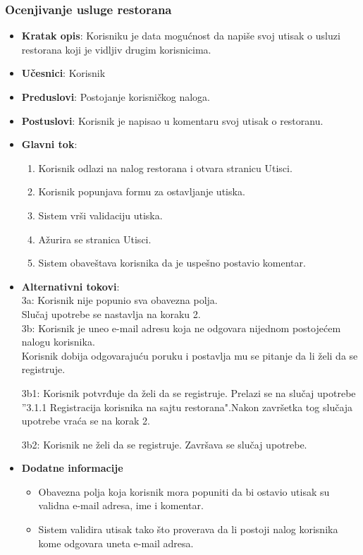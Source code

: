  
\subsubsection{Ocenjivanje usluge restorana}
\begin{itemize}
    \item \textbf{Kratak opis}:
    Korisniku je data mogućnost da napiše svoj utisak o usluzi restorana koji je vidljiv drugim korisnicima.
    \item \textbf{Učesnici}:
    Korisnik
    \item \textbf{Preduslovi}:
    Postojanje korisničkog naloga. 
    \item \textbf{Postuslovi}:
    Korisnik je napisao u komentaru svoj utisak
    o restoranu.
    \item \textbf{Glavni tok}:
   \begin{enumerate}
        \item Korisnik odlazi na nalog restorana i otvara stranicu Utisci.
        \item Korisnik popunjava formu za ostavljanje utiska.
        \item Sistem vrši validaciju utiska.
        \item Ažurira se stranica Utisci.
        \item Sistem obaveštava korisnika da je uspešno postavio komentar.
\end{enumerate}
\end{itemize}
\begin{itemize}
\item \textbf {Alternativni tokovi}:\\ 
 3a: Korisnik nije popunio sva obavezna polja.\\
 Slučaj upotrebe se nastavlja na koraku 2.\\
 3b: Korisnik je uneo e-mail adresu koja ne odgovara nijednom postojećem nalogu korisnika. \\
 Korisnik dobija odgovarajuću poruku i postavlja mu se pitanje da li želi da se registruje.
 
\quad 3b1: Korisnik potvrđuje da želi da se registruje.
Prelazi se na slučaj upotrebe ”3.1.1 Registracija korisnika na sajtu restorana".Nakon završetka tog slučaja upotrebe vraća se
na korak 2. 

\quad 3b2: Korisnik ne želi da se registruje. Završava se slučaj upotrebe.
\end{itemize}

\begin{itemize} 
     \item \textbf{Dodatne informacije}
 \begin{itemize}
     \item Obavezna polja koja korisnik mora popuniti da bi ostavio utisak su validna e-mail adresa, ime i komentar.
    \item Sistem validira utisak tako što proverava da li postoji nalog korisnika kome odgovara uneta e-mail adresa.
 \end{itemize}
 \end{itemize}
 
